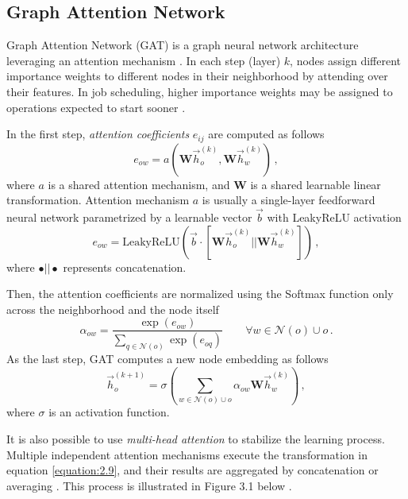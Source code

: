 \subsection{Graph Attention Network}
Graph Attention Network (GAT) is a graph neural network architecture leveraging an attention mechanism \cite{veličković2018graph}. In each step (layer) $k$, nodes assign different importance weights to different nodes in their neighborhood by attending over their features. In job scheduling, higher importance weights may be assigned to operations expected to start sooner \cite{9826438}.
\par
In the first step, \textit{attention coefficients} $e_{ij}$ are computed as follows \cite{9826438, veličković2018graph}
\begin{equation} \label{equation:2.6}
	e_{ow} = a\left ( \boldsymbol{W} \vec{h}_o^{(k)}, \boldsymbol{W} \vec{h}_w^{(k)}  \right ) \, ,
\end{equation}  
where $a$ is a shared attention mechanism, and $\boldsymbol{W}$ is a shared learnable linear transformation. Attention mechanism $a$ is usually a single-layer feedforward neural network parametrized by a learnable vector $\vec{b}$ with LeakyReLU activation \cite{9826438, veličković2018graph, DBLP:journals/corr/abs-2105-14491}
\begin{equation} \label{equation:2.7}
	e_{ow} = \text{LeakyReLU}\left ( \vec{b} \cdot \left [ \boldsymbol{W}\vec{h}_o^{(k)} || \boldsymbol{W}\vec{h}_w^{(k)} \right ] \right ) \, ,
\end{equation}
where $\bullet||\bullet$ represents concatenation.
\par
Then, the attention coefficients are normalized using the Softmax function only across the neighborhood and the node itself \cite{9826438, veličković2018graph}
\begin{equation}
	\alpha_{ow} = \frac{\exp(e_{ow})}{\sum_{q \in \mathcal{N}(o)} \exp(e_{oq})} \hspace{2em} \forall w \in \mathcal{N}(o) \cup {o} \, .
\end{equation}
As the last step, GAT computes a new node embedding as follows \cite{9826438, veličković2018graph}
\begin{equation} \label{equation:2.9}
	\vec{h}_o^{(k+1)} = \sigma \left ( \sum_{w \in \mathcal{N}(o) \cup {o}} \alpha_{ow} \boldsymbol{W} \vec{h}_w^{(k)} \right ) \, ,
\end{equation}
where $\sigma$ is an activation function. 
\par
It is also possible to use \textit{multi-head attention} to stabilize the learning process. Multiple independent attention mechanisms execute the transformation in equation \ref{equation:2.9}, and their results are aggregated by concatenation or averaging \cite{veličković2018graph}. This process is illustrated in Figure 3.1 below \cite{veličković2018graph}.
